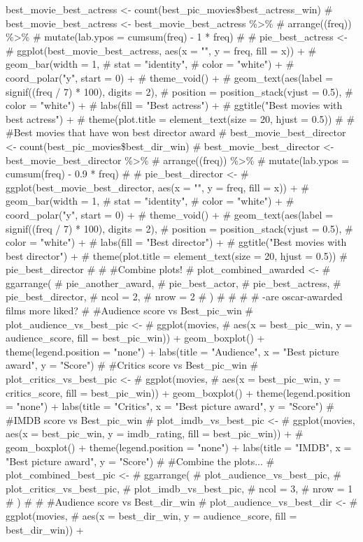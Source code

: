 \documentclass[]{article}
\begin{document}
{best\_movie\_best\_actress \textless{}- count(best\_pic\_movies\$best\_actress\_win) \# best\_movie\_best\_actress \textless{}- best\_movie\_best\_actress \%\textgreater{}\% \#   arrange((freq)) \%\textgreater{}\% \#   mutate(lab.ypos = cumsum(freq) - 1 * freq) \#  \# pie\_best\_actress \textless{}- \#   ggplot(best\_movie\_best\_actress, aes(x = "", y = freq, fill = x)) + \#   geom\_bar(width = 1, \#            stat = "identity", \#            color = "white") + \#   coord\_polar("y", start = 0) + \#   theme\_void() + \#   geom\_text(aes(label = signif((freq / 7) * 100), digits = 2), \#             position = position\_stack(vjust = 0.5), \#             color = "white") + \#   labs(fill = "Best actress") + \#   ggtitle("Best movies with best actress") + \#   theme(plot.title = element\_text(size = 20, hjust = 0.5)) \#  \# \#Best movies that have won best director award \# best\_movie\_best\_director \textless{}- count(best\_pic\_movies\$best\_dir\_win) \# best\_movie\_best\_director \textless{}- best\_movie\_best\_director \%\textgreater{}\% \#   arrange((freq)) \%\textgreater{}\% \#   mutate(lab.ypos = cumsum(freq) - 0.9 * freq) \#  \# pie\_best\_director \textless{}- \#   ggplot(best\_movie\_best\_director, aes(x = "", y = freq, fill = x)) + \#   geom\_bar(width = 1, \#            stat = "identity", \#            color = "white") + \#   coord\_polar("y", start = 0) + \#   theme\_void() + \#   geom\_text(aes(label = signif((freq / 7) * 100), digits = 2), \#             position = position\_stack(vjust = 0.5), \#             color = "white") + \#   labs(fill = "Best director") + \#   ggtitle("Best movies with best director") + \#   theme(plot.title = element\_text(size = 20, hjust = 0.5)) \# pie\_best\_director \#  \# \#Combine plots! \# plot\_combined\_awarded \textless{}- \#   ggarrange( \#     pie\_another\_award, \#     pie\_best\_actor, \#     pie\_best\_actress, \#     pie\_best\_director, \#     ncol = 2, \#     nrow = 2 \#   ) \#  \#  \# \# -are oscar-awarded films more liked? \# \#Audience score vs Best\_pic\_win \# plot\_audience\_vs\_best\_pic \textless{}- \#   ggplot(movies, \#          aes(x = best\_pic\_win, y = audience\_score, fill = best\_pic\_win)) + geom\_boxplot() + theme(legend.position = "none") + labs(title = "Audience", x = "Best picture award", y = "Score") \# \#Critics score vs Best\_pic\_win \# plot\_critics\_vs\_best\_pic \textless{}- \#   ggplot(movies, \#          aes(x = best\_pic\_win, y = critics\_score, fill = best\_pic\_win)) + geom\_boxplot() + theme(legend.position = "none") + labs(title = "Critics", x = "Best picture award", y = "Score") \# \#IMDB score vs Best\_pic\_win \# plot\_imdb\_vs\_best\_pic \textless{}- \#   ggplot(movies, aes(x = best\_pic\_win, y = imdb\_rating, fill = best\_pic\_win)) + \#   geom\_boxplot() + theme(legend.position = "none") + labs(title = "IMDB", x = "Best picture award", y = "Score") \# \#Combine the plots... \# plot\_combined\_best\_pic \textless{}- \#   ggarrange( \#     plot\_audience\_vs\_best\_pic, \#     plot\_critics\_vs\_best\_pic, \#     plot\_imdb\_vs\_best\_pic, \#     ncol = 3, \#     nrow = 1 \#   ) \#  \# \#Audience score vs Best\_dir\_win \# plot\_audience\_vs\_best\_dir \textless{}- \#   ggplot(movies, \#          aes(x = best\_dir\_win, y = audience\_score, fill = best\_dir\_win)) + }
\end{document}
